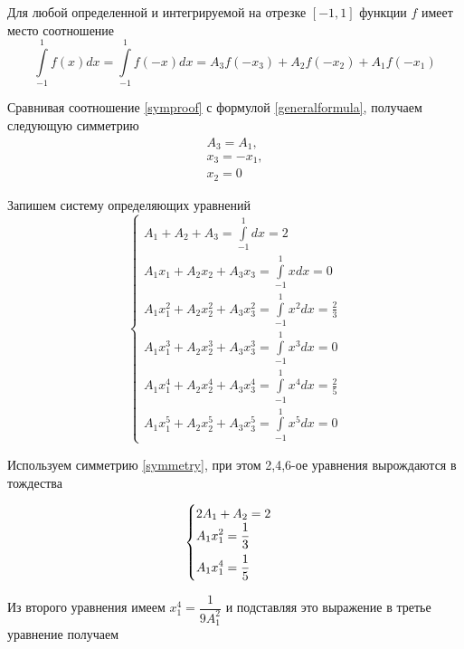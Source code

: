\documentclass[a4paper, 12pt]{article}
\begin{document}
	Для любой определенной и интегрируемой на отрезке $[-1,1]$ функции $f$ имеет место соотношение
	\begin{equation} \label{symproof}
		\int\limits_{-1}^{1}f(x)dx=\int\limits_{-1}^{1}f(-x)dx=A_3f(-x_3)+A_2f(-x_2)+A_1f(-x_1)
	\end{equation}
	
	Сравнивая соотношение \eqref{symproof} с формулой \eqref{generalformula}, получаем следующую симметрию
	\begin{equation} \label{symmetry}
		\begin{gathered}
			A_3=A_1,\\
			x_3=-x_1,\\
			x_2=0
		\end{gathered}
	\end{equation}

	Запишем систему определяющих уравнений
	\begin{equation}
		\begin{cases}
			\displaystyle
			A_1+A_2+A_3=\int\limits_{-1}^1dx=2\\
			\displaystyle
			A_1x_1+A_2x_2+A_3x_3=\int\limits_{-1}^1xdx=0\\
			\displaystyle
			A_1x_1^2+A_2x_2^2+A_3x_3^2=\int\limits_{-1}^1x^2dx=\frac{2}{3}\\
			\displaystyle
			A_1x_1^3+A_2x_2^3+A_3x_3^3=\int\limits_{-1}^1x^3dx=0\\
			\displaystyle
			A_1x_1^4+A_2x_2^4+A_3x_3^4=\int\limits_{-1}^1x^4dx=\frac{2}{5}\\
			\displaystyle
			A_1x_1^5+A_2x_2^5+A_3x_3^5=\int\limits_{-1}^1x^5dx=0
		\end{cases}
	\end{equation}

	Используем симметрию \eqref{symmetry}, при этом 2,4,6-ое уравнения вырождаются в тождества
	
	\begin{equation}
		\begin{cases}
			2A_1+A_2=2 \\
			\displaystyle \vspace{0.5em}
			A_1x_1^2=\frac{1}{3} \\
			\displaystyle
			A_1x_1^4=\frac{1}{5}
		\end{cases}
	\end{equation}

	Из второго уравнения имеем $x_1^4=\dfrac{1}{9A_1^2}$ и подставляя это выражение в третье уравнение получаем
	
\end{document}
